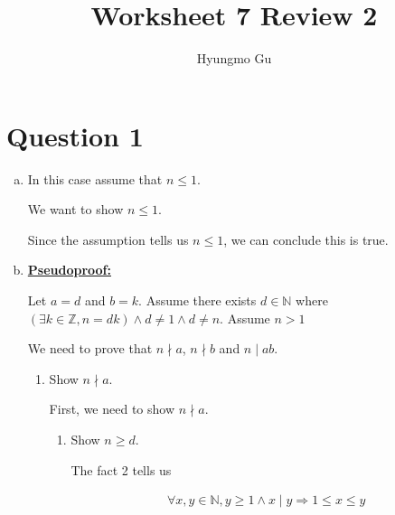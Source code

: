 \documentclass[12pt]{article}
\begin{document}
\title{Worksheet 7 Review 2}
\author{Hyungmo Gu}
\maketitle

\section*{Question 1}
\begin{enumerate}[a.]
    \item

    In this case assume that $n \leq 1$.

    \bigskip

    We want to show $n \leq 1$.

    \bigskip

    Since the assumption tells us $n \leq 1$, we can conclude this is true.

    \item

    \begin{mdframed}

    \underline{\textbf{Pseudoproof:}}

    \bigskip

    Let $a = d$ and $b = k$. Assume there exists $d \in \mathbb{N}$ where
    $(\exists k \in \mathbb{Z}, n = dk) \land d \neq 1 \land d \neq n$. Assume $n > 1$

    \bigskip

    We need to prove that $n \nmid a$, $n \nmid b$ and $n \mid ab$.

    \bigskip

    \begin{enumerate}[1.]
        \item Show $n \nmid a$.

        \bigskip

        First, we need to show $n \nmid a$.

        \bigskip

        \begin{enumerate}[1.]

            \item Show $n \geq d$.

            \bigskip

            \begin{mdframed}
            The fact 2 tells us

            \begin{align}
                \forall x,y \in \mathbb{N}, y \geq 1 \land x \mid y \Rightarrow 1 \leq x \leq y
            \end{align}


\end{mdframed}
\end{enumerate}
\end{enumerate}
\end{mdframed}
\end{enumerate}
\end{document}
